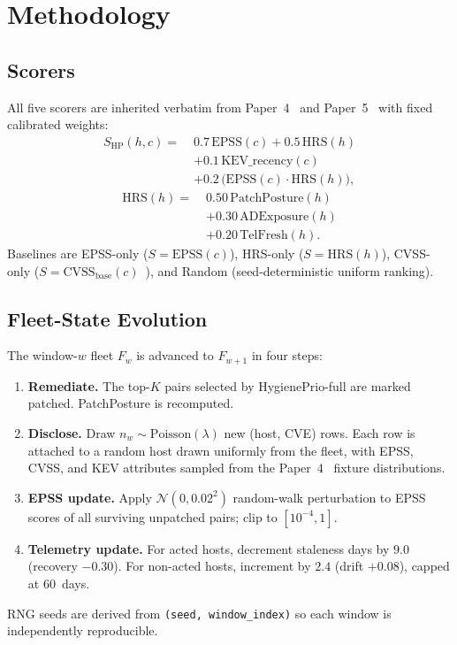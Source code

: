 \section{Methodology}

\subsection{Scorers}

All five scorers are inherited verbatim from Paper~4~\cite{paper4hygieneprio}
and Paper~5~\cite{paper5temporal} with fixed calibrated weights:
\begin{equation}
\begin{aligned}
S_{\mathrm{HP}}(h,c) =\;& 0.7\,\mathrm{EPSS}(c) + 0.5\,\mathrm{HRS}(h) \\
                       & + 0.1\,\mathrm{KEV\_recency}(c) \\
                       & + 0.2\,\bigl(\mathrm{EPSS}(c) \cdot \mathrm{HRS}(h)\bigr),
\end{aligned}
\label{eq:hp}
\end{equation}
\begin{equation}
\begin{aligned}
\mathrm{HRS}(h) =\;& 0.50\,\mathrm{PatchPosture}(h) \\
                  & + 0.30\,\mathrm{ADExposure}(h) \\
                  & + 0.20\,\mathrm{TelFresh}(h).
\end{aligned}
\end{equation}
Baselines are EPSS-only ($S = \mathrm{EPSS}(c)$), HRS-only
($S = \mathrm{HRS}(h)$), CVSS-only ($S = \mathrm{CVSS}_{\mathrm{base}}(c)$~\cite{first2019cvss}),
and Random (seed-deterministic uniform ranking).

\subsection{Fleet-State Evolution}

The window-$w$ fleet $F_w$ is advanced to $F_{w+1}$ in four steps:
\begin{enumerate}
\item \textbf{Remediate.} The top-$K$ pairs selected by HygienePrio-full
are marked patched. PatchPosture is recomputed.
\item \textbf{Disclose.} Draw $n_w \sim \mathrm{Poisson}(\lambda)$ new
(host, CVE) rows. Each row is attached to a random host drawn uniformly
from the fleet, with EPSS, CVSS, and KEV attributes sampled from the
Paper~4~\cite{paper4hygieneprio} fixture distributions.
\item \textbf{EPSS update.} Apply $\mathcal{N}(0, 0.02^2)$ random-walk
perturbation to EPSS scores of all surviving unpatched pairs; clip to
$[10^{-4}, 1]$.
\item \textbf{Telemetry update.} For acted hosts, decrement staleness
days by $9.0$ (recovery $-0.30$). For non-acted hosts, increment by
$2.4$ (drift $+0.08$), capped at 60~days.
\end{enumerate}
RNG seeds are derived from \texttt{(seed, window\_index)} so each
window is independently reproducible.

